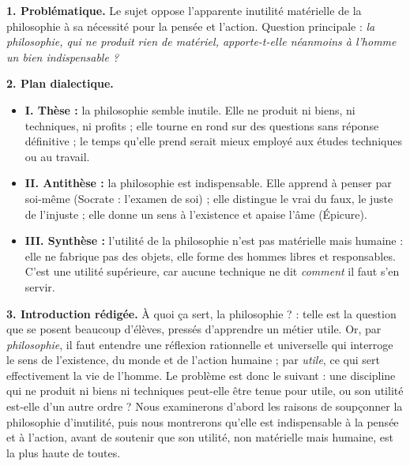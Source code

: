 \documentclass[11pt]{article}
\begin{document}
\begin{corrige}
\textbf{1. Problématique.} Le sujet oppose l'apparente inutilité matérielle de la philosophie à sa nécessité pour la pensée et l'action. Question principale : \emph{la philosophie, qui ne produit rien de matériel, apporte-t-elle néanmoins à l'homme un bien indispensable ?}

\textbf{2. Plan dialectique.}
\begin{itemize}
\item \textbf{I. Thèse :} la philosophie semble inutile. Elle ne produit ni biens, ni techniques, ni profits ; elle tourne en rond sur des questions sans réponse définitive ; le temps qu'elle prend serait mieux employé aux études techniques ou au travail.
\item \textbf{II. Antithèse :} la philosophie est indispensable. Elle apprend à penser par soi-même (Socrate : l'examen de soi) ; elle distingue le vrai du faux, le juste de l'injuste ; elle donne un sens à l'existence et apaise l'âme (Épicure).
\item \textbf{III. Synthèse :} l'utilité de la philosophie n'est pas matérielle mais humaine : elle ne fabrique pas des objets, elle forme des hommes libres et responsables. C'est une utilité supérieure, car aucune technique ne dit \emph{comment} il faut s'en servir.
\end{itemize}

\textbf{3. Introduction rédigée.} \og À quoi ça sert, la philosophie ? \fg{} : telle est la question que se posent beaucoup d'élèves, pressés d'apprendre un métier utile. Or, par \emph{philosophie}, il faut entendre une réflexion rationnelle et universelle qui interroge le sens de l'existence, du monde et de l'action humaine ; par \emph{utile}, ce qui sert effectivement la vie de l'homme. Le problème est donc le suivant : une discipline qui ne produit ni biens ni techniques peut-elle être tenue pour utile, ou son utilité est-elle d'un autre ordre ? Nous examinerons d'abord les raisons de soupçonner la philosophie d'inutilité, puis nous montrerons qu'elle est indispensable à la pensée et à l'action, avant de soutenir que son utilité, non matérielle mais humaine, est la plus haute de toutes.


\end{corrige}
\end{document}
